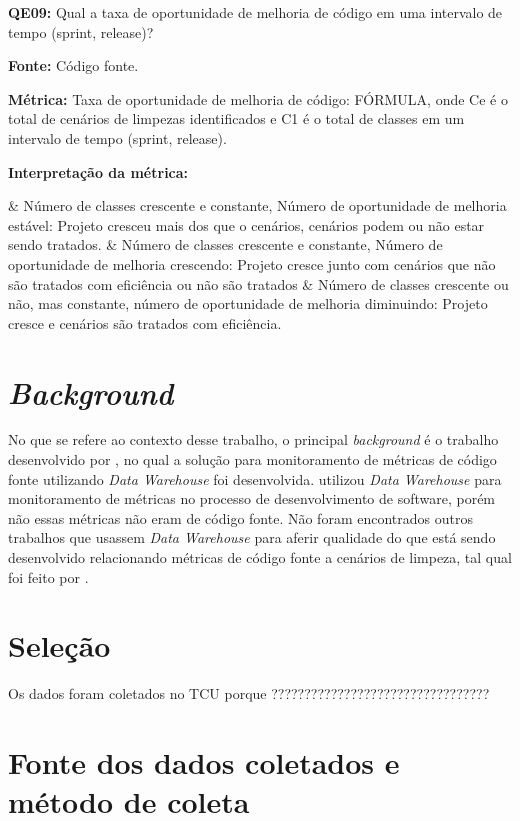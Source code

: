 \textbf{QE09: } Qual a taxa de oportunidade de melhoria de código em uma intervalo de tempo (sprint, release)? 

\textbf{Fonte:} Código fonte.

\textbf{Métrica:} Taxa de oportunidade de melhoria de código: FÓRMULA, onde Ce é o total de cenários de limpezas identificados e C1 é o total de classes em um intervalo de tempo (sprint, release).

\textbf{Interpretação da métrica: } 

\begin{easylist}[itemize]	
	& Número de classes crescente e constante, Número de oportunidade de melhoria estável: Projeto cresceu mais dos 	que o cenários, cenários podem ou não estar sendo tratados.
	& Número de classes crescente e constante, Número de oportunidade de melhoria crescendo: Projeto cresce junto 		com cenários que não são tratados com eficiência ou não são tratados
	& Número de classes crescente ou não, mas constante, número de oportunidade de melhoria diminuindo: Projeto 		cresce e cenários são tratados com eficiência.	
	\end{easylist}	

\section{\textit{Background}}

No que se refere ao contexto desse trabalho, o principal \textit{background} é o trabalho desenvolvido por , no qual a solução para monitoramento de métricas de código fonte utilizando \textit{Data Warehouse} foi desenvolvida.  utilizou \textit{Data Warehouse} para monitoramento de métricas no processo de desenvolvimento de software, porém não essas métricas não eram de código fonte. Não foram encontrados outros trabalhos que usassem \textit{Data Warehouse} para aferir qualidade do que está sendo desenvolvido relacionando métricas de código fonte a cenários de limpeza, tal qual foi feito por .

\section{Seleção}

Os dados foram coletados no TCU porque ?????????????????????????????????

\section{Fonte dos dados coletados e método de coleta}

